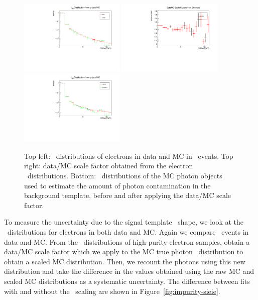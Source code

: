 \begin{figure}[htbp]
  \centering
  \includegraphics[width=0.45\textwidth]{Calibration/Figures/pvsf/chiso_electrons_logy.pdf}
  \includegraphics[width=0.45\textwidth]{Calibration/Figures/pvsf/chiso_scale.pdf}
  \includegraphics[width=0.45\textwidth]{Calibration/Figures/pvsf/chiso_photons_logy.pdf}
  \caption{
    Top left: \ICH\ distributions of electrons in data and MC in \Zee\ events.
    Top right: data/MC scale factor obtained from the electron \ICH\ distributions.
    Bottom: \ICH\ distributions of the MC photon objects used to estimate the amount of photon contamination in the background template, before and after applying the data/MC scale factor.
  }
  \label{fig:impurity-chiso}
\end{figure}

To measure the uncertainty due to the signal template \sieie\ shape, we look at the \sieie\ distributions for electrons in both data and MC. Again we compare \Zee\ events in data and MC.
From the \sieie\ distributions of high-purity electron samples, obtain a data/MC scale factor which we apply to the MC true photon \sieie\ distribution to obtain a scaled MC distribution.
Then, we recount the photons using this new distribution and take the difference in the values obtained using the raw MC and scaled MC distributions as a systematic uncertainty. 
The difference between fits with and without the \sieie\ scaling are shown in Figure~\ref{fig:impurity-sieie}.

